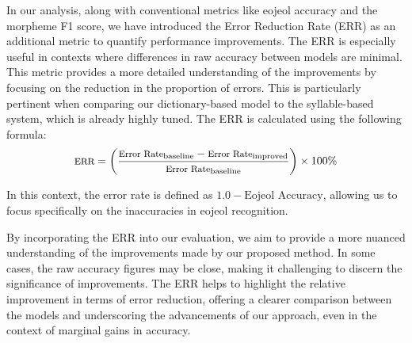 \documentclass[AMS,STIX2COL]{WileyNJD-v2}
\begin{document}
    In our analysis, along with conventional metrics like eojeol accuracy and the morpheme F1 score, we have introduced the Error Reduction Rate (ERR) as an additional metric to quantify performance improvements.
    The ERR is especially useful in contexts where differences in raw accuracy between models are minimal.
    This metric provides a more detailed understanding of the improvements by focusing on the reduction in the proportion of errors.
    This is particularly pertinent when comparing our dictionary-based model to the syllable-based system, which is already highly tuned.
    The ERR is calculated using the following formula:
    \vspace{1mm}
    \[
        \footnotesize
        \text{ERR} = \left( \frac{\text{Error Rate}_{\text{baseline}} - \text{Error Rate}_{\text{improved}}}{\text{Error Rate}_{\text{baseline}}} \right) \times 100\%
    \]
    \vspace{0.5mm}

    In this context, the error rate is defined as \(1.0 - \text{Eojeol Accuracy}\), allowing us to focus specifically on the inaccuracies in eojeol recognition.

    By incorporating the ERR into our evaluation, we aim to provide a more nuanced understanding of the improvements made by our proposed method.
    In some cases, the raw accuracy figures may be close, making it challenging to discern the significance of improvements.
    The ERR helps to highlight the relative improvement in terms of error reduction, offering a clearer comparison between the models and underscoring the advancements of our approach, even in the context of marginal gains in accuracy.
\end{document}
